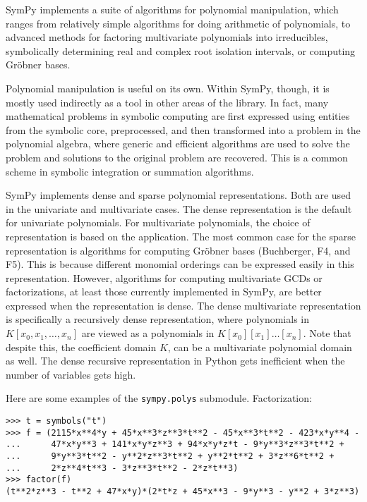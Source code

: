 
SymPy implements a suite of algorithms for polynomial manipulation,
which ranges from relatively simple algorithms for doing arithmetic of
polynomials, to advanced methods for factoring multivariate polynomials
into irreducibles, symbolically determining real and complex root isolation
intervals, or computing Gr\"{o}bner bases.

Polynomial manipulation is useful on its own. Within SymPy, though, it is mostly used
indirectly as a tool in other areas of the library. In fact, many mathematical
problems in symbolic computing are first expressed using entities from the
symbolic core, preprocessed, and then transformed into a problem in the
polynomial algebra, where generic and efficient algorithms are used to solve
the problem and solutions to the original problem are recovered.
This is a common scheme in symbolic integration or summation algorithms.

SymPy implements dense and sparse polynomial representations. Both are used in
the univariate and multivariate cases. The dense representation is the default
for univariate polynomials. For multivariate polynomials, the choice of
representation is based on the application. The most common case for the sparse
representation is algorithms for computing Gr\"{o}bner bases (Buchberger, F4,
and F5).
This is
because different monomial orderings can be expressed easily in this
representation. However, algorithms for computing multivariate GCDs or
factorizations, at least those currently implemented in SymPy,
are better expressed when the representation is dense. The dense multivariate
representation is specifically a recursively dense representation, where
polynomials in $K[x_0, x_1, \dotsc, x_n]$ are viewed as a polynomials in
$K[x_0][x_1]\dotso[x_n]$. Note that despite this, the coefficient domain $K$,
can be a multivariate polynomial domain as well. The dense recursive
representation in Python gets inefficient when the number of variables gets
high.

Here are some examples of the \texttt{sympy.polys} submodule.
\noindent Factorization:
\begin{verbatim}
>>> t = symbols("t")
>>> f = (2115*x**4*y + 45*x**3*z**3*t**2 - 45*x**3*t**2 - 423*x*y**4 -
...      47*x*y**3 + 141*x*y*z**3 + 94*x*y*z*t - 9*y**3*z**3*t**2 +
...      9*y**3*t**2 - y**2*z**3*t**2 + y**2*t**2 + 3*z**6*t**2 +
...      2*z**4*t**3 - 3*z**3*t**2 - 2*z*t**3)
>>> factor(f)
(t**2*z**3 - t**2 + 47*x*y)*(2*t*z + 45*x**3 - 9*y**3 - y**2 + 3*z**3)
\end{verbatim}

